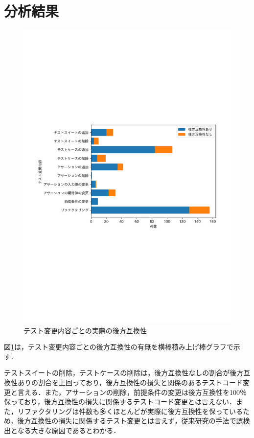 \documentclass[11pt,dvipdfmx]{jreport}
\begin{document}
\section{分析結果}
\begin{figure}[t]
  \label{fig:test_pattern}
  \centering
  \includegraphics[width=1.0\linewidth]{fig/barh-test-pattern.pdf}
  \caption{テスト変更内容ごとの実際の後方互換性}
\end{figure}

図\ref{fig:test_pattern}は，テスト変更内容ごとの後方互換性の有無を横棒積み上げ棒グラフで示す．

テストスイートの削除，テストケースの削除は，後方互換性なしの割合が後方互換性ありの割合を上回っており，後方互換性の損失と関係のあるテストコード変更と言える．また，アサーションの削除，前提条件の変更は後方互換性を100％保っており，後方互換性の損失に関係するテストコード変更とは言えない．また，リファクタリングは件数も多くほとんどが実際に後方互換性を保っているため，後方互換性の損失に関係するテスト変更とは言えず，従来研究の手法で誤検出となる大きな原因であるとわかる．
\end{document}
